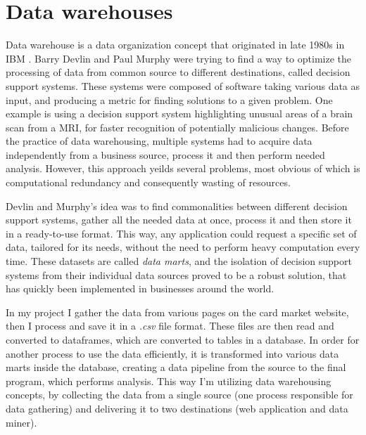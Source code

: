 \section{Data warehouses}
Data warehouse is a data organization concept that originated in late 1980s in IBM \cite{dataWarehouses}. Barry Devlin and Paul Murphy were trying to find a way to optimize the processing of data from common source to different destinations, called decision support systems. These systems were composed of software taking various data as input, and producing a metric for finding solutions to a given problem. One example is using a decision support system highlighting unusual areas of a brain scan from a MRI, for faster recognition of potentially malicious changes. Before the practice of data warehousing, multiple systems had to acquire data independently from a business source, process it and then perform needed analysis. However, this approach yeilds several problems, most obvious of which is computational redundancy and consequently wasting of resources. \par
Devlin and Murphy's idea was to find commonalities between different decision support systems, gather all the needed data at once, process it and then store it in a ready-to-use format. This way, any application could request a specific set of data, tailored for its needs, without the need to perform heavy computation every time. These datasets are called \textit{data marts}, and the isolation of decision support systems from their individual data sources proved to be a robust solution, that has quickly been implemented in businesses around the world. \par
In my project I gather the data from various pages on the card market website, then I process and save it in a \textit{.csv} file format. These files are then read and converted to dataframes, which are converted to tables in a database. In order for another process to use the data efficiently, it is transformed into various data marts inside the database, creating a data pipeline from the source to the final program, which performs analysis. This way I'm utilizing data warehousing concepts, by collecting the data from a single source (one process responsible for data gathering) and delivering it to two destinations (web application and data miner).


